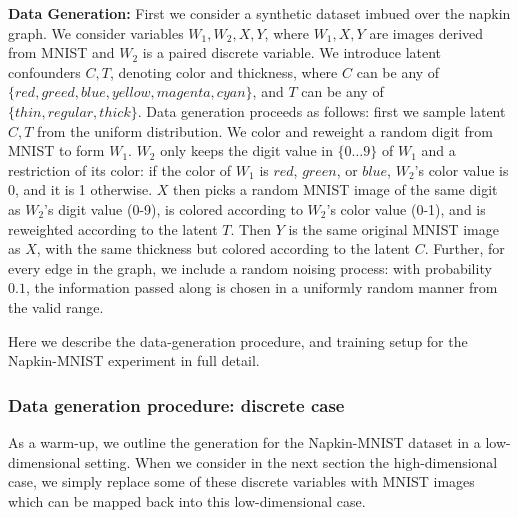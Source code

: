 \documentclass{article}
\theoremstyle{plain}
\theoremstyle{definition}
\theoremstyle{remark}
\begin{document}
	\textbf{Data Generation:} First we consider a synthetic dataset imbued over the napkin graph. 
	We consider variables $W_1, W_2, X,Y$, where $W_1, X,Y$ are images derived from MNIST and $W_2$ is a paired discrete variable. We introduce latent confounders $C, T$, denoting color and thickness, where $C$ can be any of $\{red, greed, blue, yellow, magenta, cyan\}$, and $T$ can be any of $\{thin, regular, thick\}$. Data generation proceeds as follows: first we sample latent $C, T$ from the uniform distribution. We color and reweight a random digit from MNIST to form $W_1$. $W_2$ only keeps the digit value in $\{0\dots 9\}$ of $W_1$ and a restriction of its color: if the color of $W_1$ is $red$, $green$, or $blue$, $W_2$'s color value is 0, and it is 1 otherwise. $X$ then picks a random MNIST image of the same digit as $W_2$'s digit value (0-9), is colored according to $W_2$'s color value (0-1), and is reweighted according to the latent $T$. Then $Y$ is the same original MNIST image as $X$, with the same thickness but colored according to the latent $C$. Further, for every edge in the graph, we include a random noising process: with probability $0.1$, the information passed along is chosen in a uniformly random manner from the valid range.
	
	
	
	Here we describe the data-generation procedure, and training setup for the Napkin-MNIST experiment in full detail.
	\subsubsection{Data generation procedure: discrete case}
	As a warm-up, we outline the generation for the Napkin-MNIST dataset in a low-dimensional setting. When we consider in the next section the high-dimensional case, we simply replace some of these discrete variables with MNIST images which can be mapped back into this low-dimensional case. 
	
\end{document}
